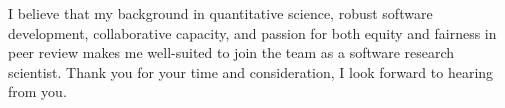 



I believe that my background in quantitative science, robust software
development, collaborative capacity, and passion for both equity and 
fairness in peer review makes me well-suited to join the team as a software
research scientist. Thank you for your time and consideration,
I look forward to hearing from you. 


\makeletterclosing %




